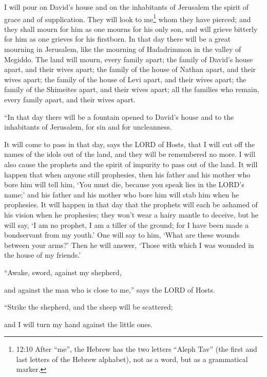 \myverse{}I will pour on David’s house and on the inhabitants of Jerusalem
the spirit of grace and of supplication. They will look to me\footnote{12:10 After “me”, the Hebrew has the two letters “Aleph Tav” (the first and last letters of the Hebrew
	alphabet), not as a word, but as a grammatical marker.} whom they have pierced; and they shall
mourn for him as one mourns for his only son, and will grieve bitterly for him as one grieves for his
firstborn.
\myverse{}In that day there will be a great mourning in Jerusalem, like the mourning
of Hadadrimmon in the valley of Megiddo.
\myverse{}The land will mourn, every family apart; the family of David’s house apart,
and their wives apart; the family of the house of Nathan apart, and their wives apart;
\myverse{}the family of the house of Levi apart, and their wives apart; the family
of the Shimeites apart, and their wives apart;
\myverse{}all the families who remain, every family apart, and their wives apart.


\mychapter{} \myverse*{}“In that day there will be a fountain opened to David’s house
and to the inhabitants of Jerusalem, for sin and for uncleanness.

\myverse{}It will come to pass in that day, says the LORD of Hosts, that
I will cut off the names of the idols out of the land, and they will be remembered no more. I will also
cause the prophets and the spirit of impurity to pass out of the land.
\myverse{}It will happen that when anyone still prophesies, then his father and his mother
who bore him will tell him, ‘You must die, because you speak lies in the LORD’s name;’ and his father
and his mother who bore him will stab him when he prophesies.
\myverse{}It will happen in that day that the prophets will each be ashamed of his vision
when he prophesies; they won’t wear a hairy mantle to deceive,
\myverse{}but he will say, ‘I am no prophet, I am a tiller of the ground; for I have
been made a bondservant from my youth.’
\myverse{}One will say to him, ‘What are these wounds between your arms?’ Then he will
answer, ‘Those with which I was wounded in the house of my friends.’


\vspace{\baselineskip} \myverse{}“Awake, sword, against my shepherd,

and against the man who is close to me,” says the LORD of Hosts.

“Strike the shepherd, and the sheep will be scattered;

and I will turn my hand against the little ones.

